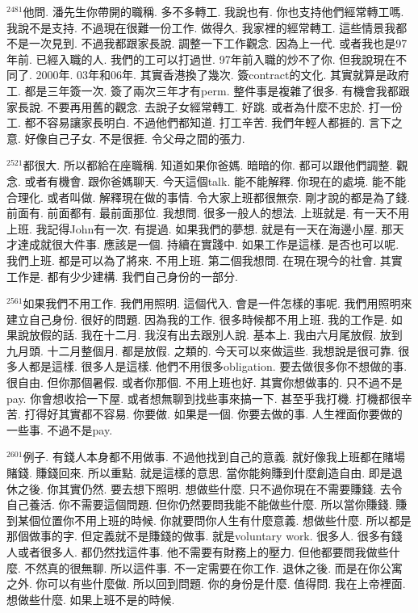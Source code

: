 \documentclass{book}
\begin{document}
$^{2481}$他問.
潘先生你帶開的職稱.
多不多轉工.
我說也有.
你也支持他們經常轉工嗎.
我說不是支持.
不過現在很難一份工作.
做得久.
我家裡的經常轉工.
這些情景我都不是一次見到.
不過我都跟家長說.
調整一下工作觀念.
因為上一代.
或者我也是97年前.
已經入職的人.
我們的工可以打過世.
97年前入職的炒不了你.
但我說現在不同了.
2000年.
03年和06年.
其實香港換了幾次.
簽contract的文化.
其實就算是政府工.
都是三年簽一次.
簽了兩次三年才有perm.
整件事是複雜了很多.
有機會我都跟家長說.
不要再用舊的觀念.
去說子女經常轉工.
好跳.
或者為什麼不忠於.
打一份工.
都不容易讓家長明白.
不過他們都知道.
打工辛苦.
我們年輕人都捱的.
言下之意.
好像自己子女.
不是很捱.
令父母之間的張力.

$^{2521}$都很大.
所以都給在座職稱.
知道如果你爸媽.
暗暗的你.
都可以跟他們調整.
觀念.
或者有機會.
跟你爸媽聊天.
今天這個talk.
能不能解釋.
你現在的處境.
能不能合理化.
或者叫做.
解釋現在做的事情.
令大家上班都很無奈.
剛才說的都是為了錢.
前面有.
前面都有.
最前面那位.
我想問.
很多一般人的想法.
上班就是.
有一天不用上班.
我記得John有一次.
有提過.
如果我們的夢想.
就是有一天在海邊小屋.
那天才達成就很大件事.
應該是一個.
持續在實踐中.
如果工作是這樣.
是否也可以呢.
我們上班.
都是可以為了將來.
不用上班.
第二個我想問.
在現在現今的社會.
其實工作是.
都有少少建構.
我們自己身份的一部分.

$^{2561}$如果我們不用工作.
我們用照明.
這個代入.
會是一件怎樣的事呢.
我們用照明來建立自己身份.
很好的問題.
因為我的工作.
很多時候都不用上班.
我的工作是.
如果說放假的話.
我在十二月.
我沒有出去跟別人說.
基本上.
我由六月尾放假.
放到九月頭.
十二月整個月.
都是放假.
之類的.
今天可以來做這些.
我想說是很可靠.
很多人都是這樣.
很多人是這樣.
他們不用很多obligation.
要去做很多你不想做的事.
很自由.
但你那個暑假.
或者你那個.
不用上班也好.
其實你想做事的.
只不過不是pay.
你會想收拾一下屋.
或者想無聊到找些事來搞一下.
甚至乎我打機.
打機都很辛苦.
打得好其實都不容易.
你要做.
如果是一個.
你要去做的事.
人生裡面你要做的一些事.
不過不是pay.

$^{2601}$例子.
有錢人本身都不用做事.
不過他找到自己的意義.
就好像我上班都在賭場賭錢.
賺錢回來.
所以重點.
就是這樣的意思.
當你能夠賺到什麼創造自由.
即是退休之後.
你其實仍然.
要去想下照明.
想做些什麼.
只不過你現在不需要賺錢.
去令自己養活.
你不需要這個問題.
但你仍然要問我能不能做些什麼.
所以當你賺錢.
賺到某個位置你不用上班的時候.
你就要問你人生有什麼意義.
想做些什麼.
所以都是那個做事的字.
但定義就不是賺錢的做事.
就是voluntary work.
很多人.
很多有錢人或者很多人.
都仍然找這件事.
他不需要有財務上的壓力.
但他都要問我做些什麼.
不然真的很無聊.
所以這件事.
不一定需要在你工作.
退休之後.
而是在你公寓之外.
你可以有些什麼做.
所以回到問題.
你的身份是什麼.
值得問.
我在上帝裡面.
想做些什麼.
如果上班不是的時候.
\end{document}
